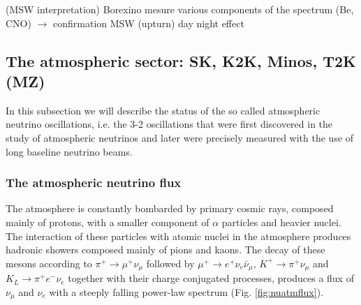 \documentclass[preprint,12pt]{elsarticle}
\begin{document}
(MSW interpretation) Borexino  mesure various components of the spectrum (Be, CNO) $\rightarrow$ confirmation MSW (upturn) day night effect


\subsection{The atmospheric sector: SK, K2K, Minos, T2K  (MZ)}

In this subsection we will describe the status of the so called atmospheric neutrino oscillations, i.e. the 3-2 oscillations that were first discovered in the study of atmospheric neutrinos and later were precisely measured with the use of long baseline neutrino beams.   


\subsubsection{The atmospheric neutrino flux}

The atmosphere is constantly bombarded by primary cosmic rays, composed mainly of protons, with a smaller component of $\alpha$ particles and heavier nuclei. The interaction of these particles with atomic nuclei in the atmosphere produces hadronic showers composed mainly of pions and kaons. The decay of these mesons according to 
$\pi^+ \rightarrow \mu^+ \nu_\mu$ followed by 
$\mu^+ \rightarrow e^+ \nu_e \bar{\nu}_\mu $,
$K^+ \rightarrow \pi^+ \nu_\mu$ and $K_L \rightarrow \pi^+ e^- \nu_e$
together with their charge conjugated processes, produces a flux of $\nu_\mu$ and $\nu_e$ with a steeply falling power-law spectrum (Fig. \ref{fig:nuatmflux}). 
\end{document}
